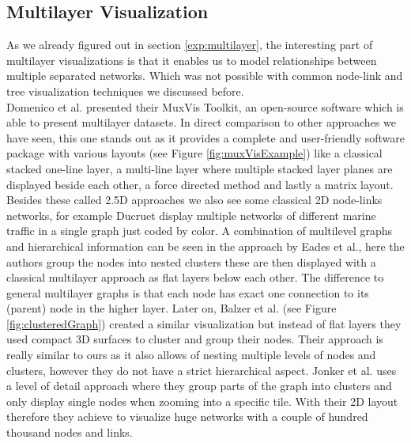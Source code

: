\subsection{Multilayer Visualization}
As we already figured out in section \ref{exp:multilayer}, the interesting part of multilayer visualizations is that it enables us to model relationships between multiple separated networks. Which was not possible with common node-link and tree visualization techniques we discussed before.\\
Domenico et al. \cite{de_domenico_muxviz_2015} presented their MuxVis Toolkit, an open-source software which is able to present multilayer datasets. In direct comparison to other approaches we have seen, this one stands out as it provides a complete and user-friendly software package with various layouts (see Figure \ref{fig:muxVisExample}) like a classical stacked one-line layer, a multi-line layer where multiple stacked layer planes are displayed beside each other, a force directed method and lastly a matrix layout. Besides these called 2.5D approaches we also see some classical 2D node-links networks, for example Ducruet \cite{ducruet_multilayer_nodate} display multiple networks of different marine traffic in a single graph just coded by color. 
A combination of multilevel graphs and hierarchical information can be seen in the approach by Eades \cite{eades_multilevel_1997} et al., here the authors group the nodes into nested clusters these are then displayed with a classical multilayer approach as flat layers below each other. The difference to general multilayer graphs is that each node has exact one connection to its (parent) node in the higher layer. 
Later on, Balzer et al. \cite{balzer_level--detail_2007} (see Figure \ref{fig:clusteredGraph}) created a similar visualization but instead of flat layers they used compact 3D surfaces to cluster and group their nodes. Their approach is really similar to ours as it also allows of nesting multiple levels of nodes and clusters, however they do not have a strict hierarchical aspect. 
Jonker et al. \cite{jonker_graph_2017} uses a level of detail approach where they group parts of the graph into clusters and only display single nodes when zooming into a specific tile. With their 2D layout therefore they achieve to visualize huge networks with a couple of hundred thousand nodes and links. 

